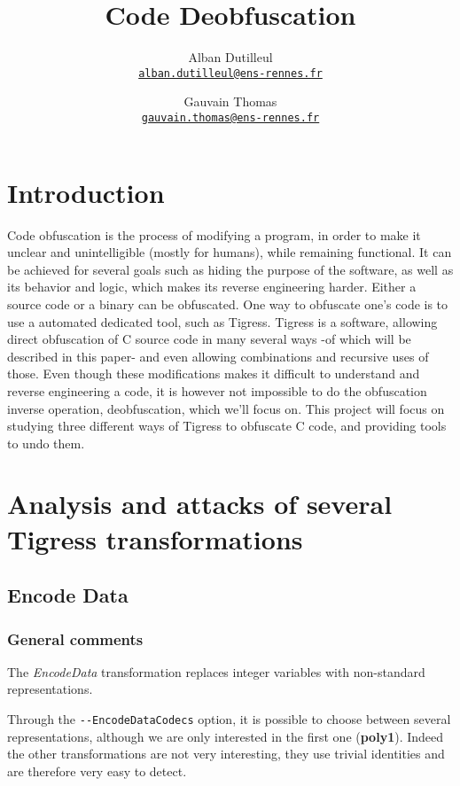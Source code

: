 \documentclass{projectreport}
\title{Code Deobfuscation}
\author{
  Alban Dutilleul\\
  \texttt{\href{mailto:alban.dutilleul@ens-rennes.fr}{alban.dutilleul@ens-rennes.fr}}
  \and
  Gauvain Thomas\\
  \texttt{\href{mailto:gauvain.thomas@ens-rennes.fr}{gauvain.thomas@ens-rennes.fr}}
}
\begin{document}

\maketitle


\section{Introduction}

Code obfuscation is the process of modifying a program, in order to make it unclear and unintelligible (mostly for humans), while remaining functional. It can be achieved for several goals such as hiding the purpose of the software, as well as its behavior and logic, which makes its reverse engineering harder. Either a source code or a binary can be obfuscated.
One way to obfuscate one's code is to use a automated dedicated tool, such as Tigress.
Tigress is a software, allowing direct obfuscation of C source code in many several ways -of which will be described in this paper- and even allowing combinations and recursive uses of those.
Even though these modifications makes it difficult to understand and reverse engineering a code, it is however not impossible to do the obfuscation inverse operation, deobfuscation, which we'll focus on.
This project will focus on studying three different ways of Tigress to obfuscate C code, and providing tools to undo them.

\section{Analysis and attacks of several Tigress transformations}

\subsection{Encode Data}
\subsubsection{General comments}
The \textit{EncodeData} transformation replaces integer variables with non-standard representations. 

Through the \verb|--EncodeDataCodecs| option, it is possible to choose between several representations, although we are only interested in the first one (\textbf{\textsf{poly1}}).
Indeed the other transformations are not very interesting, they use trivial identities and are therefore very easy to detect.
\end{document}
